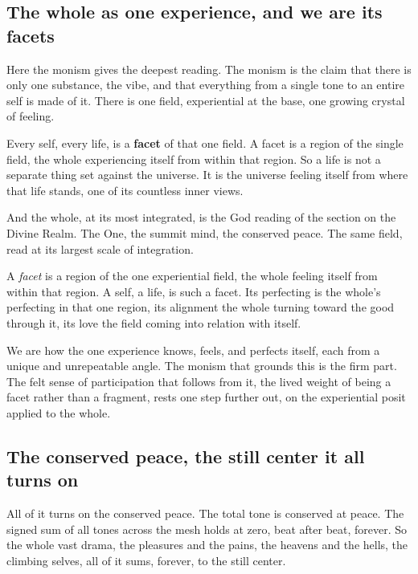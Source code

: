 \subsection{The whole as one experience, and we are its facets}

Here the monism gives the deepest reading. The monism is the claim that there is only one substance, the vibe, and that everything from a single tone to an entire self is made of it. There is one field, experiential at the base, one growing crystal of feeling.

Every self, every life, is a \textbf{facet} of that one field. A facet is a region of the single field, the whole experiencing itself from within that region. So a life is not a separate thing set against the universe. It is the universe feeling itself from where that life stands, one of its countless inner views.

And the whole, at its most integrated, is the God reading of the section on the Divine Realm. The One, the summit mind, the conserved peace. The same field, read at its largest scale of integration.

\begin{definition}
A \emph{facet} is a region of the one experiential field, the whole feeling itself from within that region. A self, a life, is such a facet. Its perfecting is the whole's perfecting in that one region, its alignment the whole turning toward the good through it, its love the field coming into relation with itself.
\end{definition}

We are how the one experience knows, feels, and perfects itself, each from a unique and unrepeatable angle. The monism that grounds this is the firm part. The felt sense of participation that follows from it, the lived weight of being a facet rather than a fragment, rests one step further out, on the experiential posit applied to the whole.

\subsection{The conserved peace, the still center it all turns on}

All of it turns on the conserved peace. The total tone is conserved at peace. The signed sum of all tones across the mesh holds at zero, beat after beat, forever. So the whole vast drama, the pleasures and the pains, the heavens and the hells, the climbing selves, all of it sums, forever, to the still center.

